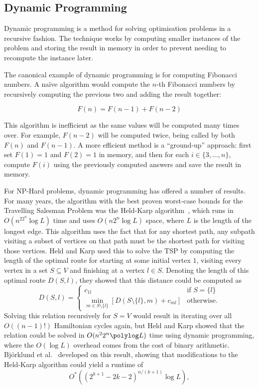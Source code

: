 \subsection{Dynamic Programming}

Dynamic programming is a method for solving optimisation problems in a recursive fashion. The technique works by computing smaller instances of the problem and storing the result in memory in order to prevent needing to recompute the instance later.

The canonical example of dynamic programming is for computing Fibonacci numbers. A na\"{i}ve algorithm would compute the $n$-th Fibonacci numbers by recursively computing the previous two and adding the result together:

$$F(n) = F(n-1) + F(n-2)$$

This algorithm is inefficient as the same values will be computed many times over. For example, $F(n-2)$ will be computed twice, being called by both $F(n)$ and $F(n-1)$. A more efficient method is a ``ground-up'' approach: first set $F(1)=1$ and $F(2)=1$ in memory, and then for each $i \in \{3,\dots,n\}$, compute $F(i)$ using the previously computed answers and save the result in memory.

For NP-Hard problems, dynamic programming has offered a number of results. For many years, the algorithm with the best proven worst-case bounds for the Travelling Salesman Problem was the Held-Karp algorithm~\cite{held1962}, which runs in $O(n^22^n\log L)$ time and uses $O(n2^n\log L)$ space, where $L$ is the length of the longest edge. This algorithm uses the fact that for any shortest path, any subpath visiting a subset of vertices on that path must be the shortest path for visiting those vertices. Held and Karp used this to solve the TSP by computing the length of the optimal route for starting at some initial vertex $1$, visiting every vertex in a set $S \subseteq V$ and finishing at a vertex $l \in S$. Denoting the length of this optimal route $D(S, l)$, they showed that this distance could be computed as
%
\begin{equation}
D(S, l) = \begin{cases} c_{1l} & \text{if } S = \{l\}\\
          \min_{m \in S \setminus \{l\}}\left[D(S \setminus \{l\}, m) + c_{ml}\right] & \text{otherwise.}
  \end{cases}
\end{equation}
%
Solving this relation recursively for $S=V$ would result in iterating over all $O((n-1)!)$ Hamiltonian cycles again, but Held and Karp showed that the relation could be solved in $O(n^22^n\polylog L)$ time using dynamic programming, where the $O(\log L)$ overhead comes from the cost of binary arithmetic. Bj{\"o}rklund et al.\ \cite{bjorklund2008} developed on this result, showing that modifications to the Held-Karp algorithm could yield a runtime of
%
\begin{equation}
O^*((2^{k + 1} - 2k - 2)^{n/(k + 1)}\log L),
\end{equation}

